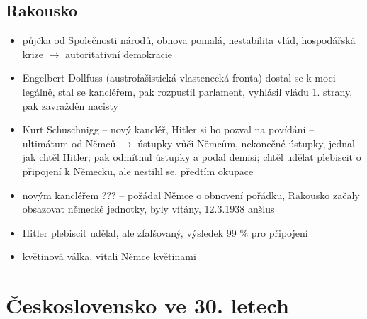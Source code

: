 \documentclass{article}
\begin{document}
\subsection*{Rakousko}
\begin{itemize}
    \item půjčka od Společnosti národů, obnova pomalá, nestabilita vlád, hospodářská krize $\rightarrow$ autoritativní demokracie
    \item Engelbert Dollfuss (austrofašistická vlastenecká fronta) dostal se k moci legálně, stal se kancléřem, pak rozpustil parlament, vyhlásil vládu 1. strany, pak zavražděn nacisty
    \item Kurt Schuschnigg -- nový kancléř, Hitler si ho pozval na povídání -- ultimátum od Němců $\rightarrow$ ústupky vůči Němcům, nekonečné ústupky, jednal jak chtěl Hitler; pak odmítnul ústupky a podal demisi; chtěl udělat plebiscit o připojení k Německu, ale nestihl se, předtím okupace
    \item novým kancléřem ??? -- požádal Němce o obnovení pořádku, Rakousko začaly obsazovat německé jednotky, byly vítány, 12.3.1938 anšlus
    \item Hitler plebiscit udělal, ale zfalšovaný, výsledek 99 \% pro připojení
    \item květinová válka, vítali Němce květinami
\end{itemize}

\section*{Československo ve 30. letech}
\end{document}
